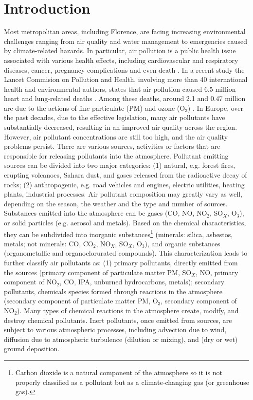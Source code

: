 \documentclass[journal]{IEEEtran}
\begin{document}
\section{Introduction}
Most metropolitan areas, including Florence, are facing increasing environmental challenges ranging from air quality
and water management to emergencies caused by climate-related hazards. In particular, 
air pollution is a public health issue associated with various health effects, including cardiovascular and respiratory
diseases, cancer, pregnancy complications and even death \cite{cavaliere01,GuFoDLe01}. 
In a recent study the Lancet Commision on Pollution and Health, involving more than 40 international health and environmental authors, 
states that air pollution caused 6.5 million heart and lung-related deaths \cite{cavaliere01,TheLancetComm01}. Among these deaths, around
2.1 and 0.47 million are due to the actions of fine particulate (PM) and
ozone (O$_3$) \cite{cavaliere01,OccandEnvMed01}. In Europe, over the past decades, due to the effective
legislation, many air pollutants have substantially decreased, resulting in an
improved air quality across the region. However, air pollutant concentrations
are still too high, and the air quality problems persist. 
There are various sources, activities or factors that are responsible
for releasing pollutants into the atmosphere. Pollutant emitting sources can
be divided into two major categories: (1) natural, e.g. forest fires, erupting volcanoes, Sahara dust, and gases
released from the radioactive decay of rocks; (2) anthropogenic, e.g. road vehicles and engines, electric utilities, heating plants, industrial processes.
Air pollutant composition may greatly vary as well, depending on the season, the weather and the type and number of sources. Substances emitted
into the atmosphere can be gases (CO, NO, NO$_2$, SO$_X$, O$_3$), or solid particles (e.g. aerosol and metals).
Based on the chemical characteristics, they can be subdivided into
inorganic substances\footnote{Carbon dioxide is a natural component of the atmosphere so it is not properly classified as a pollutant but as a climate-changing gas (or greenhouse gas).} (minerals: silica, asbestos, metals; not minerals:
CO, CO$_2$, NO$_X$, SO$_X$, O$_3$), and  organic substances (organometallic and organoclorurated compounds).
This characterization leads to further classify air pollutants as: (1) primary pollutants, directly emitted from the sources (primary component of particulate matter PM, SO$_X$, NO, primary component of NO$_2$,
CO, IPA, unburned hydrocarbons, metals);
secondary pollutants, chemicals species formed through reactions in
the atmosphere (secondary component of particulate matter PM, O$_3$,
secondary component of NO$_2$).
Many types of chemical reactions in the atmosphere create, modify, and
destroy chemical pollutants. Inert pollutants, once emitted from sources,
are subject to various atmospheric processes, including advection due to
wind, diffusion due to atmospheric turbulence (dilution or mixing), and (dry
or wet) ground deposition.
\end{document}
